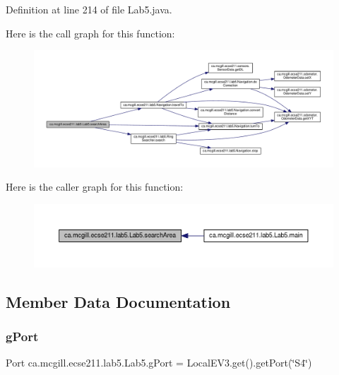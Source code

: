 Definition at line 214 of file Lab5.\+java.

Here is the call graph for this function\+:
\nopagebreak
\begin{figure}[H]
\begin{center}
\leavevmode
\includegraphics[width=350pt]{classca_1_1mcgill_1_1ecse211_1_1lab5_1_1_lab5_a0e80ac0068ef1ab41cfb571b8c65845c_cgraph}
\end{center}
\end{figure}
Here is the caller graph for this function\+:
\nopagebreak
\begin{figure}[H]
\begin{center}
\leavevmode
\includegraphics[width=350pt]{classca_1_1mcgill_1_1ecse211_1_1lab5_1_1_lab5_a0e80ac0068ef1ab41cfb571b8c65845c_icgraph}
\end{center}
\end{figure}


\subsection{Member Data Documentation}
\mbox{\label{classca_1_1mcgill_1_1ecse211_1_1lab5_1_1_lab5_a2415c0078b42b8813c3cc9304d6335ce}} 
\subsubsection{\texorpdfstring{g\+Port}{gPort}}
{\footnotesize\ttfamily Port ca.\+mcgill.\+ecse211.\+lab5.\+Lab5.\+g\+Port = Local\+E\+V3.\+get().get\+Port(\char`\"{}S4\char`\"{})\hspace{0.3cm}{\ttfamily [static]}}


